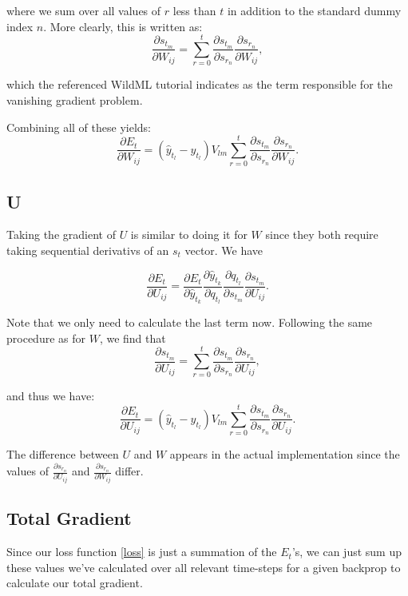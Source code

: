 \documentclass[11pt,twoside]{article}
\begin{document}
\noindent where we sum over all values of $r$ less than $t$ in addition to the standard dummy index $n$. More clearly, this is written as:
\begin{equation}
\frac{\partial s_{t_m}}{\partial W_{ij}}=\sum_{r=0}^{t}\frac{\partial s_{t_m}}{\partial s_{r_n}}\frac{\partial s_{r_n}}{\partial W_{ij}},
\end{equation}

\noindent which the referenced WildML tutorial indicates as the term responsible for the vanishing gradient problem.

\noindent Combining all of these yields:
\begin{equation}
\frac{\partial E_t}{\partial W_{ij}}=\left(\hat{y}_{t_l}-y_{t_l}\right)V_{lm}\sum_{r=0}^{t}\frac{\partial s_{t_m}}{\partial s_{r_n}}\frac{\partial s_{r_n}}{\partial W_{ij}}.
\end{equation}

\subsection{U}
Taking the gradient of $U$ is similar to doing it for $W$ since they both require taking sequential derivativs of an $s_t$ vector. We have

\begin{equation}
\frac{\partial E_t}{\partial U_{ij}}=\frac{\partial E_t}{\partial \hat{y}_{t_k}}\frac{\partial \hat{y}_{t_k}}{\partial q_{t_l}}\frac{\partial q_{t_l}}{\partial s_{t_m}}\frac{\partial s_{t_m}}{\partial U_{ij}}.
\end{equation}

\noindent Note that we only need to calculate the last term now. Following the same procedure as for $W$, we find that
\begin{equation}
\frac{\partial s_{t_m}}{\partial U_{ij}}=\sum_{r=0}^{t}\frac{\partial s_{t_m}}{\partial s_{r_n}}\frac{\partial s_{r_n}}{\partial U_{ij}},
\end{equation}

\noindent and thus we have:
\begin{equation}
\frac{\partial E_t}{\partial U_{ij}}=\left(\hat{y}_{t_l}-y_{t_l}\right)V_{lm}\sum_{r=0}^{t}\frac{\partial s_{t_m}}{\partial s_{r_n}}\frac{\partial s_{r_n}}{\partial U_{ij}}.
\end{equation}

The difference between $U$ and $W$ appears in the actual implementation since the values of $\frac{\partial s_{r_n}}{\partial U_{ij}}$ and $\frac{\partial s_{r_n}}{\partial W_{ij}}$ differ.

\subsection{Total Gradient}
Since our loss function \eqref{loss} is just a summation of the $E_t$'s, we can just sum up these values we've calculated over all relevant time-steps for a given backprop to calculate our total gradient.
\end{document}
